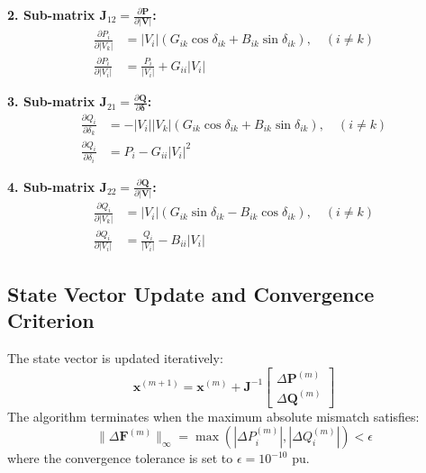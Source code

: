 ﻿\documentclass[conference,10pt]{IEEEtran}
\begin{document}
\textbf{2. Sub-matrix $\mathbf{J}_{12} = \frac{\partial \mathbf{P}}{\partial |\mathbf{V}|}$:}
\begin{align}
\frac{\partial P_i}{\partial |V_k|} &= |V_i| \left( G_{ik} \cos\delta_{ik} + B_{ik} \sin\delta_{ik} \right), \quad (i \neq k) \\
\frac{\partial P_i}{\partial |V_i|} &= \frac{P_i}{|V_i|} + G_{ii} |V_i|
\end{align}

\textbf{3. Sub-matrix $\mathbf{J}_{21} = \frac{\partial \mathbf{Q}}{\partial \boldsymbol{\delta}}$:}
\begin{align}
\frac{\partial Q_i}{\partial \delta_k} &= -|V_i| |V_k| \left( G_{ik} \cos\delta_{ik} + B_{ik} \sin\delta_{ik} \right), \quad (i \neq k) \\
\frac{\partial Q_i}{\partial \delta_i} &= P_i - G_{ii} |V_i|^2
\end{align}

\textbf{4. Sub-matrix $\mathbf{J}_{22} = \frac{\partial \mathbf{Q}}{\partial |\mathbf{V}|}$:}
\begin{align}
\frac{\partial Q_i}{\partial |V_k|} &= |V_i| \left( G_{ik} \sin\delta_{ik} - B_{ik} \cos\delta_{ik} \right), \quad (i \neq k) \\
\frac{\partial Q_i}{\partial |V_i|} &= \frac{Q_i}{|V_i|} - B_{ii} |V_i|
\end{align}

\subsection{State Vector Update and Convergence Criterion}
The state vector is updated iteratively:
\begin{equation}
\mathbf{x}^{(m+1)} = \mathbf{x}^{(m)} + \mathbf{J}^{-1} \begin{bmatrix} \Delta \mathbf{P}^{(m)} \\ \Delta \mathbf{Q}^{(m)} \end{bmatrix}
\end{equation}
The algorithm terminates when the maximum absolute mismatch satisfies:
\begin{equation}
\|\Delta \mathbf{F}^{(m)}\|_{\infty} = \max \left( |\Delta P_i^{(m)}|, |\Delta Q_i^{(m)}| \right) < \epsilon
\end{equation}
where the convergence tolerance is set to $\epsilon = 10^{-10}\text{ pu}$.
\end{document}
